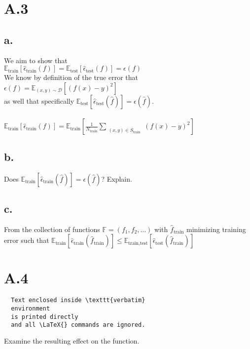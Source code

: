 \documentclass{article}
\newcommand{\field}[1]{\mathbb{#1}}
\newcommand{\1}{\mathbf{1}}
\newcommand{\E}{\mathbb{E}}
\newcommand{\F}{\field{F}} %
\begin{document}
\section*{A.3}
{\Large 

\subsection*{a.}

We aim to show that \\
$\E_{\text{train}}[\widehat{\epsilon}_{\text{train}}(f)] = \E_{\text{test}}[\widehat{\epsilon}_{\text{test}}(f)] = \epsilon(f)$ \\
We know by definition of the true error that $\epsilon(f) = \E_{(x,y) \sim \mathcal{D}}[(f(x) - y)^2]$ \\
as well that specifically $\E_{\text{test}}[\widehat{\epsilon}_{\text{test}}(\widehat{f})] = \epsilon(\widehat{f})$. \\ \\

$\E_{\text{train}}[\widehat{\epsilon}_{\text{train}}(f)] = \E_{\text{train}}[\frac{1}{N_{\text{train}}} \sum\limits_{\substack{(x,y) \in S_{\text{train}}}} (f(x) - y)^2]$ \\

\subsection*{b.}

Does $\E_{\text{train}}[\widehat{\epsilon}_{\text{train}}(\widehat{f})] = \epsilon(\widehat{f})$? Explain.

\subsection*{c.}
From the collection of functions $\F = (f_1, f_2, \dots)$ with $\widehat{f}_{\text{train}}$ minimizing training error such that $\E_{\text{train}}[\widehat{\epsilon}_{\text{train}}(\widehat{f}_{\text{train}})] \leq \E_{\text{train,test}}[\widehat{\epsilon}_{\text{test}}(\widehat{f}_{\text{train}})]$

}

\section*{A.4}
{\Large 


\begin{verbatim}
  Text enclosed inside \texttt{verbatim}
  environment 
  is printed directly 
  and all \LaTeX{} commands are ignored.
\end{verbatim}

Examine the resulting effect on the function.

}
\end{document}

